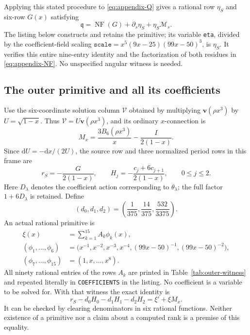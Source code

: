 \documentclass[11pt,a4paper]{article}
\newcommand{\dd}{\mathrm d}
\newcommand{\vv}{\mathbf v}
\begin{document}
Applying this stated procedure to \eqref{eq:appendix-Q} gives a rational
row \(\eta_S\) and six-row \(G(x)\) satisfying
\begin{equation}\label{eq:appendix-angular-source}
 \mathfrak q=\operatorname{NF}(G)+\partial_s\eta_S+\eta_S\mathcal M_s.
\end{equation}
The listing below constructs and retains the primitive;
its variable \texttt{eta}, divided by the coefficient-field
scaling \(\texttt{scale}=x^5(9x-25)(99x-50)^3\), is \(\eta_S\). It verifies this
entire nine-entry identity and the factorization of both residues in
\eqref{eq:appendix-NF}.  No unspecified angular witness is needed.

\subsection{The outer primitive and all its coefficients}

Use the six-coordinate solution column \(\mathcal V\) obtained by
multiplying \(\vv(\rho x^3)\) by \(U=\sqrt{1-x}\).
Thus \(\mathcal V=U\vv(\rho x^3)\), and its ordinary \(x\)-connection is
\[
 M_x=\frac{3B_6(\rho x^3)}x-\frac{I}{2(1-x)}.
\]
Since \(\dd U=-\dd x/(2U)\), the source row and three normalized period rows
in this frame are
\[
 r_S=-\frac{G}{2(1-x)},\qquad
 H_j=-\frac{c_j+6c_{j+1}}{2(1-x)},\qquad 0\le j\le2.
\]
Here \(D_\lambda\) denotes the coefficient action corresponding to
\(\theta_\lambda\); the full factor \(1+6D_\lambda\) is retained.  Define
\[
 (d_0,d_1,d_2)=\left(\frac1{375},\frac{14}{375},\frac{532}{3375}\right).
\]
An actual rational primitive is
\begin{equation}\label{eq:appendix-xi}
 \begin{aligned}
 \xi(x)&=\sum_{k=1}^{15}A_k\phi_k(x),\\
 (\phi_1,\ldots,\phi_6)&=
 \bigl(x^{-1},x^{-2},x^{-3},x^{-4},(99x-50)^{-1},(99x-50)^{-2}\bigr),\\
 (\phi_7,\ldots,\phi_{15})&=(1,x,\ldots,x^8).
 \end{aligned}
\end{equation}
All ninety rational entries of the rows \(A_k\) are printed in
Table~\ref{tab:outer-witness} and repeated literally in
\texttt{COEFFICIENTS} in the listing. No coefficient is a variable
to be solved for.  With that witness the exact identity is
\begin{equation}\label{eq:appendix-outer-identity}
 r_S-d_0H_0-d_1H_1-d_2H_2=\xi'+\xi M_x.
\end{equation}
It can be checked by clearing denominators in six rational functions.
Neither existence of a primitive nor a claim about a computed rank is
a premise of this equality.
\end{document}
